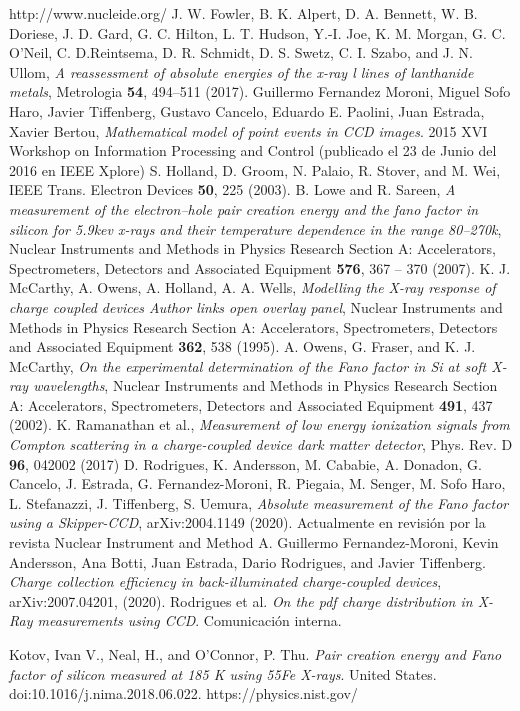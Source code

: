 \documentclass[a4paper,12pt]{report}
\begin{document}
\begin{thebibliography}{99}
http://www.nucleide.org/
J. W. Fowler, B. K. Alpert, D. A. Bennett, W. B. Doriese, J. D. Gard,
G. C. Hilton, L. T. Hudson, Y.-I. Joe, K. M. Morgan, G. C. O’Neil, C. D.Reintsema, D. R. Schmidt, D. S. Swetz, C. I. Szabo, and J. N. Ullom, \textit{A reassessment of absolute energies of the x-ray l lines of lanthanide metals}, Metrologia \textbf{54}, 494–511 (2017).
Guillermo Fernandez Moroni, Miguel Sofo Haro, Javier Tiffenberg, Gustavo Cancelo, Eduardo E. Paolini, Juan Estrada, Xavier Bertou, \textit{Mathematical model of point events in CCD images}. 2015 XVI Workshop on Information Processing and Control (publicado el 23 de Junio del 2016 en IEEE Xplore)
S. Holland, D. Groom, N. Palaio, R. Stover, and M. Wei, IEEE Trans. Electron Devices \textbf{50}, 225 (2003).
B. Lowe and R. Sareen, \textit{A measurement of the electron–hole pair creation energy and the fano factor in silicon for 5.9kev x-rays and their temperature dependence in the range 80–270k}, Nuclear Instruments and Methods in Physics Research Section A: Accelerators, Spectrometers, Detectors and Associated Equipment \textbf{576}, 367 – 370 (2007).
K. J. McCarthy, A. Owens, A. Holland,  A. A. Wells, \textit{Modelling the X-ray response of charge coupled devices
Author links open overlay panel}, Nuclear Instruments and Methods in Physics Research Section A: Accelerators, Spectrometers, Detectors and Associated Equipment \textbf{362}, 538 (1995).
A. Owens, G. Fraser, and K. J. McCarthy, \textit{On the experimental determination of the Fano factor in Si at soft X-ray wavelengths}, Nuclear Instruments and Methods in Physics Research Section A: Accelerators, Spectrometers, Detectors and Associated Equipment \textbf{491}, 437 (2002).
K. Ramanathan et al., \textit{Measurement of low energy ionization signals from Compton scattering in a charge-coupled device dark matter detector}, Phys. Rev. D \textbf{96}, 042002 (2017)
D. Rodrigues, K. Andersson, M. Cababie, A. Donadon, G. Cancelo, J. Estrada, G. Fernandez-Moroni, R. Piegaia, M. Senger, M. Sofo Haro, L. Stefanazzi, J. Tiffenberg, S. Uemura, \textit{Absolute measurement of the Fano factor using a Skipper-CCD}, arXiv:2004.1149 (2020). Actualmente en revisión por la revista Nuclear Instrument and Method A.
Guillermo Fernandez-Moroni, Kevin Andersson, Ana Botti, Juan Estrada, Dario Rodrigues, and Javier Tiffenberg. \textit{Charge collection efficiency in back-illuminated charge-coupled devices}, arXiv:2007.04201, (2020).
Rodrigues et al. \textit{On the pdf charge distribution in X-Ray measurements using CCD}. Comunicación interna.

Kotov, Ivan V., Neal, H., and O'Connor, P. Thu. \textit{Pair creation energy and Fano factor of silicon measured at 185 K using 55Fe X-rays}. United States. doi:10.1016/j.nima.2018.06.022. %
https://physics.nist.gov/



\end{thebibliography}
\end{document}
